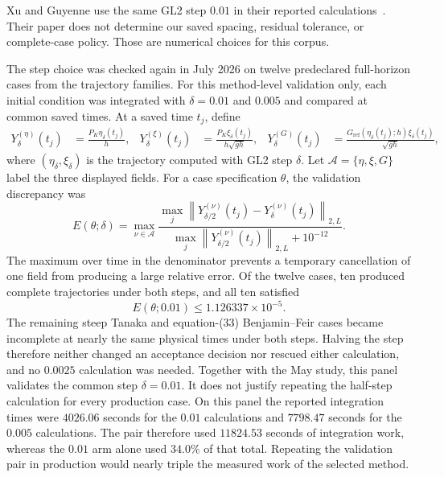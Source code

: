 \documentclass[11pt]{article}
\newcommand{\norm}[1]{\left\lVert #1\right\rVert}
\begin{document}
Xu and Guyenne use the same GL2 step $0.01$ in their reported
calculations~\cite{xu2009}.  Their paper does not determine our saved spacing,
residual tolerance, or complete-case policy.  Those are numerical choices
for this corpus.

The step choice was checked again in July 2026 on twelve predeclared
full-horizon cases from the trajectory families.  For this method-level
validation only, each initial condition was integrated with
$\delta=0.01$ and $0.005$ and compared at common saved times.  At a saved
time $t_j$, define
\begin{align}
  Y_\delta^{(\eta)}(t_j)&=\frac{P_K\eta_\delta(t_j)}{h},&
  Y_\delta^{(\xi)}(t_j)&=\frac{P_K\xi_\delta(t_j)}{h\sqrt{gh}},&
  Y_\delta^{(G)}(t_j)&=
    \frac{G_{\mathrm{ref}}(\eta_\delta(t_j);h)\xi_\delta(t_j)}
         {\sqrt{gh}},
  \label{eq:dimensionless-delivered-fields}
\end{align}
where $(\eta_\delta,\xi_\delta)$ is the trajectory computed with GL2 step
$\delta$.  Let $\mathcal A=\{\eta,\xi,G\}$ label the three displayed fields.
For a case specification $\theta$, the validation discrepancy was
\begin{equation}
  E(\theta;\delta)
  =
  \max_{\nu\in\mathcal A}
  \frac{
    \max_j\norm{Y_{\delta/2}^{(\nu)}(t_j)
                    -Y_\delta^{(\nu)}(t_j)}_{2,L}
  }{
    \max_j\norm{Y_{\delta/2}^{(\nu)}(t_j)}_{2,L}+10^{-12}
  }.
  \label{eq:method-refinement-error}
\end{equation}
The maximum over time in the denominator prevents a temporary cancellation
of one field from producing a large relative error.  Of the twelve cases,
ten produced complete trajectories under both steps, and all ten satisfied
\[
  E(\theta;0.01)\leq1.126337\times10^{-5}.
\]
The remaining steep Tanaka and equation-(33) Benjamin--Feir cases became
incomplete at nearly the same physical times under both steps.  Halving the
step therefore neither changed an acceptance decision nor rescued either
calculation, and no $0.0025$ calculation was needed.  Together with the May
study, this panel validates the common step $\delta=0.01$.  It does not
justify repeating the half-step calculation for every production case.
On this panel the reported integration times were $4026.06$ seconds for the
$0.01$ calculations and $7798.47$ seconds for the $0.005$ calculations.  The
pair therefore used $11824.53$ seconds of integration work, whereas the
$0.01$ arm alone used $34.0\%$ of that total.  Repeating the validation pair
in production would nearly triple the measured work of the selected method.
\end{document}
